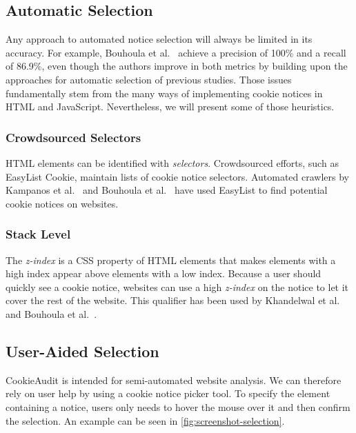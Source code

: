 \subsection{Automatic Selection}
Any approach to automated notice selection will always be limited in its accuracy.
For example, Bouhoula et al.~\cite{bouhoula2023automated} achieve a precision of 100\% and a recall of 86.9\%, even though the authors improve in both metrics by building upon the approaches for automatic selection of previous studies.
Those issues fundamentally stem from the many ways of implementing cookie notices in HTML and JavaScript.
Nevertheless, we will present some of those heuristics.

\subsubsection{Crowdsourced Selectors}
HTML elements can be identified with \emph{selectors}. 
Crowdsourced efforts, such as EasyList Cookie, maintain lists of cookie notice selectors.
Automated crawlers by Kampanos et al.~\cite{kampanos2021accept} and Bouhoula et al.~\cite{bouhoula2023automated} have used EasyList to find potential cookie notices on websites.

\subsubsection{Stack Level}
The \emph{z-index} is a CSS property of HTML elements that makes elements with a high index appear above elements with a low index. 
Because a user should quickly see a cookie notice, websites can use a high \emph{z-index} on the notice to let it cover the rest of the website. 
This qualifier has been used by Khandelwal et al.~\cite{khandelwal2023automated} and Bouhoula et al.~\cite{bouhoula2023automated}.

\subsection{User-Aided Selection} \label{subsec:user-aided-selection}
CookieAudit is intended for semi-automated website analysis.
We can therefore rely on user help by using a cookie notice picker tool.
To specify the element containing a notice, users only needs to hover the mouse over it and then confirm the selection. 
An example can be seen in \cref{fig:screenshot-selection}.

